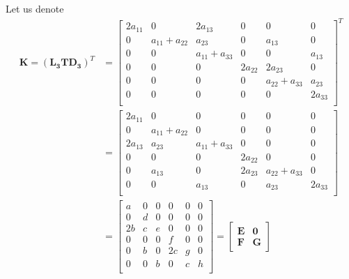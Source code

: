 \documentclass{article}
\begin{document}
Let us denote
\begin{equation}
\begin{aligned}
\mathbf{K}= { (\mathbf{L_3}\mathbf{T} \mathbf{D_3}) }^T
&=
\begin{bmatrix}
2a_{11} &0 &2a_{13} &0 &0 &0 \\
0 &a_{11}+a_{22} &a_{23} &0 &a_{13} &0 \\
0 &0 &a_{11}+a_{33} &0 &0 &a_{13} \\
0 &0 &0 &2a_{22} &2 a_{23} &0 \\
0 &0 &0 &0 &a_{22}+a_{33} &a_{23} \\
0 &0 &0 &0 &0 &2a_{33} \\
\end{bmatrix} ^T \\
&=
\begin{bmatrix}
2a_{11} &0 &0 &0 &0 &0 \\
0 &a_{11}+a_{22} &0 &0 &0 &0 \\
2 a_{13} &a_{23} &a_{11}+a_{33} &0 &0 &0 \\
0 &0 &0 &2 a_{22} &0 &0 \\
0 &a_{13} &0 &2 a_{23} &a_{22}+a_{33} &0 \\
0 &0 &a_{13} &0 &a_{23} &2a_{33} \\
\end{bmatrix} \\
& =
\begin{bmatrix}
a &0 &0 &0 &0 &0 \\
0 &d &0 &0 &0 &0 \\
2b &c &e &0 &0 &0 \\
0 &0 &0 &f &0 &0 \\
0 &b &0 &2c &g &0 \\
0 &0 &b &0 &c &h \\
\end{bmatrix}=
\left[ 
\begin{array}{cc}
\mathbf{E} & \mathbf{0} \\
\mathbf{F} & \mathbf{G}
\end{array}
\right]
\end{aligned}
\label{eq:K_definition}
\end{equation}
\end{document}
